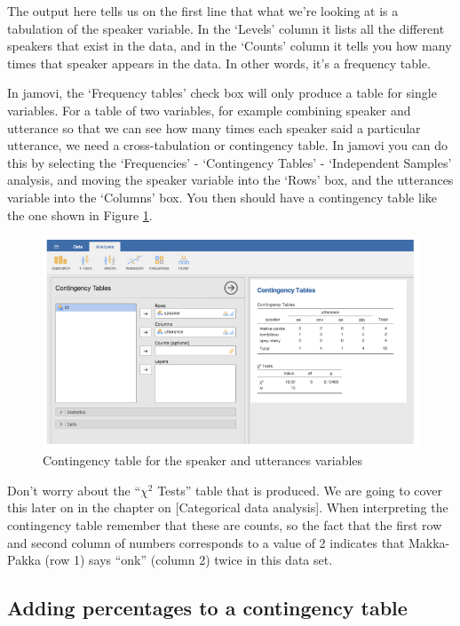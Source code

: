 \documentclass[
]{book}
\begin{document}
The output here tells us on the first line that what we're looking at is a tabulation of the speaker variable. In the `Levels' column it lists all the different speakers that exist in the data, and in the `Counts' column it tells you how many times that speaker appears in the data. In other words, it's a frequency table.

In jamovi, the `Frequency tables' check box will only produce a table for single variables. For a table of two variables, for example combining speaker and utterance so that we can see how many times each speaker said a particular utterance, we need a cross-tabulation or contingency table. In jamovi you can do this by selecting the `Frequencies' - `Contingency Tables' - `Independent Samples' analysis, and moving the speaker variable into the `Rows' box, and the utterances variable into the `Columns' box. You then should have a contingency table like the one shown in Figure \ref{fig:fig6-1}.

\begin{figure}
\includegraphics[width=0.9\linewidth]{images/Figure33} \caption{Contingency table for the speaker and utterances variables}\label{fig:fig6-1}
\end{figure}

Don't worry about the ``\(\chi^2\) Tests'' table that is produced. We are going to cover this later on in the chapter on {[}Categorical data analysis{]}. When interpreting the contingency table remember that these are counts, so the fact that the first row and second column of numbers corresponds to a value of 2 indicates that Makka-Pakka (row 1) says ``onk'' (column 2) twice in this data set.

\hypertarget{adding-percentages-to-a-contingency-table}{%
\subsection{Adding percentages to a contingency table}\label{adding-percentages-to-a-contingency-table}}
\end{document}
